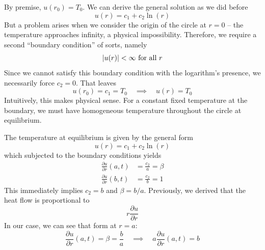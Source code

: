 \documentclass[a4paper]{article}
\begin{document}

By premise, \( u \!\left( r_{0} \right) = T_{0} \). We can derive the general solution as we did before
\[
	u \!\left( r \right) = c_{1} + c_{2}\ln\!\left(r\right)  
\]
But a problem arises when we consider the origin of the circle at \( r = 0 \) -- the temperature approaches infinity, a physical impossibility. Therefore, we require a second ``boundary condition'' of sorts, namely
\[
	\abs{u \!\left( r \right)} < \infty \text{ for all } r 
\]
Since we cannot satisfy this boundary condition with the logarithm's presence, we necessarily force \( c_{2} = 0 \). That leaves
\[
	u \!\left( r_{0} \right) = c_{1} = T_{0} \quad \implies \quad u \!\left( r \right) = T_{0}
\]
Intuitively, this makes physical sense. For a constant fixed temperature at the boundary, we must have homogeneous temperature throughout the circle at equilibrium.

\vspace{12pt}


The temperature at equilibrium is given by the general form
\[
	u \!\left( r \right) = c_{1} + c_{2}\ln\!\left(r\right)  
\]
which subjected to the boundary conditions yields
\begin{align*}
	\frac{\partial u}{\partial r}\!\left( a,t \right) & = \frac{c_{2}}{a} = \beta \\
	\frac{\partial u}{\partial r}\!\left( b,t \right) & = \frac{c_{2}}{b} = 1
\end{align*}
This immediately implies \( c_{2} = b \) and \( \beta = b / a \). Previously, we derived that the heat flow is proportional to
\[
	r \frac{\partial u}{\partial r} 
\]
In our case, we can see that form at \( r = a \):
\[
	\frac{\partial u}{\partial r}\!\left( a,t \right) = \beta = \frac{b}{a} \quad \implies \quad a \frac{\partial u}{\partial r}\!\left( a,t \right) = b 
\]
\end{document}
